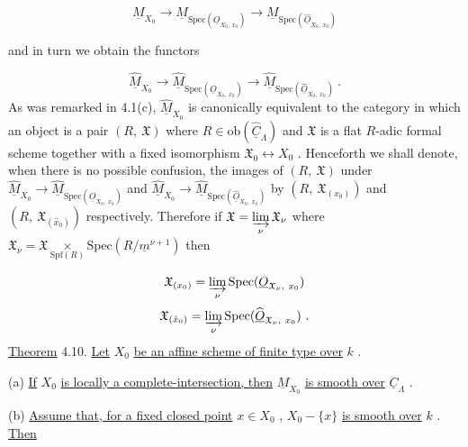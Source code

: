 \begin{equation*}
\underline{M}_{X_0} \to \underline{M}_{\mathrm{Spec}(\underline{O}_{X_0,\, x_0})} \to \underline{M}_{\mathrm{Spec}(\widehat{\underline{O}}_{X_0,\, x_0})} 
\end{equation*}


 and in turn we obtain the functors

\begin{equation*}
\widehat{\underline{M}}_{X_0} \to \widehat{\underline{M}}_{\mathrm{Spec}(\underline{O}_{X_0,\ x_0})} \to \widehat{\underline{M}}_{\mathrm{Spec}(\widehat{\underline{O}}_{X_0,\ x_0})}\ .
\end{equation*}
As was remarked in 4.1(c), $\widehat{\underline{M}}_{X_0}$  is canonically equivalent to the category in which an object is a pair  $(R,\ \mathfrak{X})$  where  $R \in \mathrm{ob}(\widehat{\underline{C}}_{\Lambda})$  and  $\mathfrak{X}$  is a flat $R$-adic formal scheme together with a fixed isomorphism  $\mathfrak{X}_0 \longleftrightarrow X_0$ . Henceforth we shall denote, when there is no possible confusion, the images of  $(R,\ \mathfrak{X})$  under $\widehat{\underline{M}}_{X_0} \to \widehat{\underline{M}}_{\mathrm{Spec}(\underline{O}_{X_0,\ x_0})}$  and  $\widehat{\underline{M}}_{X_0} \to \widehat{\underline{M}}_{\mathrm{Spec}(\widehat{\underline{O}}_{X_0,\ x_0})}$  by  $(R,\ \mathfrak{X}_{(x_0)})$  and  $(R,\ \mathfrak{X}_{(\hat{x}_0)})$ respectively. Therefore if  $\mathfrak{X} = \varinjlim\limits_{\nu} \mathfrak{X}_{\nu}$  where  $\mathfrak{X}_{\nu} = \mathfrak{X} \underset{\mathrm{Spf}(R)}{\times} \mathrm{Spec}(R/\underline{m}^{\nu+1})$    then

\begin{equation*}
\mathfrak{X}_{(x_0)} = \varinjlim\limits_{\nu} \mathrm{Spec}(\underline{O}_{\mathfrak{X}_{\nu},\ x_0})
\end{equation*}
\begin{equation*}
\mathfrak{X}_{(\hat{x}_0)} = \varinjlim\limits_{\nu} \mathrm{Spec}(\widehat{\underline{O}}_{\mathfrak{X}_{\nu},\ x_0})\ .
\end{equation*}
\underline{Theorem} 4.10. \underline{Let}  $X_0$  \underline{be an affine scheme of finite type over}  $k$  .

(a)  \underline{If}  $X_0$  \underline{is locally a complete-intersection, then}  $\underline{M}_{X_0}$  \underline{is smooth over}  $\underline{C}_{\Lambda}$  .

(b)  \underline{Assume that, for a fixed closed point}  $x \in X_0$  ,  $X_0 - \{x\}$  \underline{is smooth over}  $k$  . \underline{Then}

